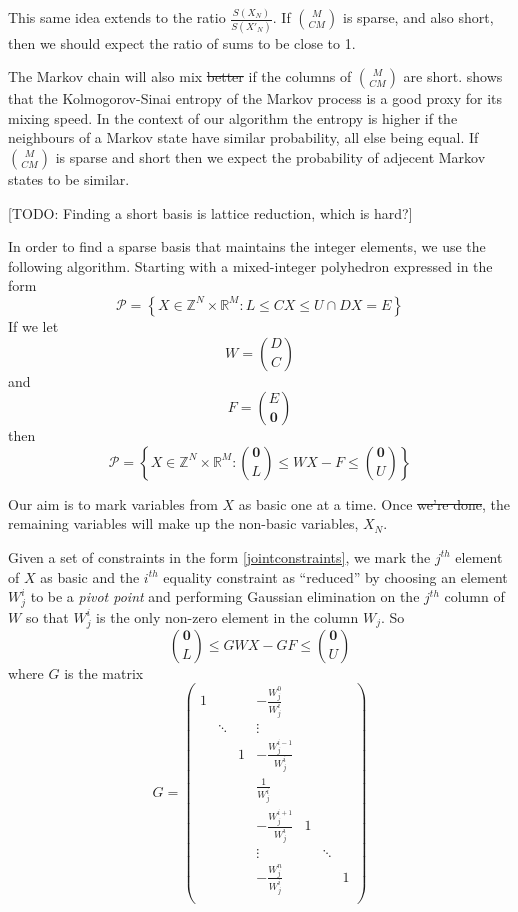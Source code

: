 \documentclass{article}
\providecommand{\DIFaddtex}[1]{{\protect\color{blue}\uwave{#1}}} %
\providecommand{\DIFdeltex}[1]{{\protect\color{red}\sout{#1}}}                      %
\providecommand{\DIFaddbegin}{} %
\providecommand{\DIFaddend}{} %
\providecommand{\DIFdelbegin}{} %
\providecommand{\DIFdelend}{} %
\providecommand{\DIFadd}[1]{\texorpdfstring{\DIFaddtex{#1}}{#1}} %
\providecommand{\DIFdel}[1]{\texorpdfstring{\DIFdeltex{#1}}{}} %
\newcommand{\DIFscaledelfig}{0.5}
\newlength{\DIFdelgraphicswidth} %
\newlength{\DIFdelgraphicsheight} %
\newcommand{\DIFaddincludegraphics}[2][]{{\color{blue}\fbox{\DIFOincludegraphics[#1]{#2}}}} %
\newcommand{\DIFdelincludegraphics}[2][]{%
\sbox{\DIFdelgraphicsbox}{\DIFOincludegraphics[#1]{#2}}%
\settoboxwidth{\DIFdelgraphicswidth}{\DIFdelgraphicsbox} %
\settoboxtotalheight{\DIFdelgraphicsheight}{\DIFdelgraphicsbox} %
\scalebox{\DIFscaledelfig}{%
\parbox[b]{\DIFdelgraphicswidth}{\usebox{\DIFdelgraphicsbox}\\[-\baselineskip] \rule{\DIFdelgraphicswidth}{0em}}\llap{\resizebox{\DIFdelgraphicswidth}{\DIFdelgraphicsheight}{%
\setlength{\unitlength}{\DIFdelgraphicswidth}%
\begin{picture}(1,1)%
\thicklines\linethickness{2pt} %
{\color[rgb]{1,0,0}\put(0,0){\framebox(1,1){}}}%
{\color[rgb]{1,0,0}\put(0,0){\line( 1,1){1}}}%
{\color[rgb]{1,0,0}\put(0,1){\line(1,-1){1}}}%
\end{picture}%
}\hspace*{3pt}}} %
} %
\DeclareRobustCommand{\DIFaddbegin}{\DIFOaddbegin \let\includegraphics\DIFaddincludegraphics} %
\DeclareRobustCommand{\DIFaddend}{\DIFOaddend \let\includegraphics\DIFOincludegraphics} %
\DeclareRobustCommand{\DIFdelbegin}{\DIFOdelbegin \let\includegraphics\DIFdelincludegraphics} %
\DeclareRobustCommand{\DIFdelend}{\DIFOaddend \let\includegraphics\DIFOincludegraphics} %
\begin{document}
\DIFdelend This same idea extends to the ratio $\frac{S(X_N)}{S(X'_N)}$. If ${M \choose CM}$ is sparse, and also short, then we should expect the ratio of sums to be close to 1.

The Markov chain will also mix \DIFdelbegin \DIFdel{better }\DIFdelend \DIFaddbegin \DIFadd{more effectively }\DIFaddend if the columns of ${M \choose CM}$ are short. \citet{mihelich2018maximum} shows that the Kolmogorov-Sinai entropy of the Markov process is a good proxy for its mixing speed. In the context of our algorithm the entropy is higher if the neighbours of a Markov state have similar probability, all else being equal. If ${M \choose CM}$ is sparse and short then we expect the probability of adjecent Markov states to be similar.

[TODO: Finding a short basis is lattice reduction, which is hard?]

In order to find a sparse basis that maintains the integer elements, we use the following algorithm. Starting with a mixed-integer polyhedron expressed in the form
\[
\mathcal{P} = \left\{X \in \mathbb{Z}^N \times \mathbb{R}^M: L \le CX \le U \cap DX = E \right\}
\]
If we let
\[
W= {D \choose C}
\]
and
\[
F = {E \choose \mathbf{0}}
\]
then
\begin{equation}
\mathcal{P} = \left\{X \in \mathbb{Z}^N \times \mathbb{R}^M: {\mathbf{0} \choose L} \le W X - F \le {\mathbf{0} \choose U} \right\}
\label{jointconstraints}
\end{equation}

Our aim is to mark variables from $X$ as basic one at a time. Once \DIFdelbegin \DIFdel{we're done}\DIFdelend \DIFaddbegin \DIFadd{complete}\DIFaddend , the remaining variables will make up the non-basic variables, $X_N$.

Given a set of constraints in the form \DIFaddbegin \DIFadd{of }\DIFaddend \eqref{jointconstraints}, we mark the $j^{th}$ element of $X$ as basic and the $i^{th}$ equality constraint as ``reduced'' by choosing an element $W^i_j$ to be a \textit{pivot point} and performing Gaussian elimination on the $j^{th}$ column of $W$ so that $W^i_j$ is the only non-zero element in the column $W_j$. So
\[
{\mathbf{0} \choose L} \le GWX - GF \le {\mathbf{0} \choose U}
\]
where $G$ is the matrix
\[
G =  
\begin{pmatrix}
1 &  & &-\frac{W^0_j}{W^i_j} & & &\\
& \ddots & &\vdots & & &\\
& & 1 & -\frac{W^{i-1}_j}{W^i_j} & & &\\
& & & \frac{1}{W^i_j} & & &\\
& &  & -\frac{W^{i+1}_j}{W^i_j} & 1 & &\\
& & & \vdots & & \ddots &\\
& & & -\frac{W^n_j}{W^i_j} & & &1\\
\end{pmatrix}
\]
\end{document}
